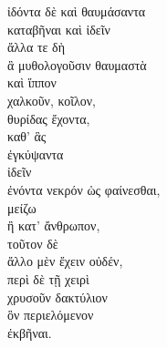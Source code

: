 {\large
\begin{greek}
\noindent ἰδόντα δὲ καὶ θαυμάσαντα\\
καταβῆναι καὶ ἰδεῖν\\
ἄλλα τε δὴ\\
\tabto{2em} ἃ μυθολογοῦσιν θαυμαστὰ\\
καὶ ἵππον\\
\tabto{2em} χαλκοῦν, κοῖλον,\\
\tabto{2em} θυρίδας ἔχοντα,\\
\tabto{4em} καθ' ἃς\\
\tabto{4em} ἐγκύψαντα\\
\tabto{4em} ἰδεῖν\\
\tabto{4em} ἐνόντα νεκρόν ὡς φαίνεσθαι,\\
\tabto{4em} μείζω\\
\tabto{6em} ἢ κατ' ἄνθρωπον,\\
\tabto{4em} τοῦτον δὲ\\
\tabto{6em} ἄλλο μὲν ἔχειν οὐδέν,\\
\tabto{6em} περὶ δὲ τῇ χειρὶ\\
\tabto{6em} χρυσοῦν δακτύλιον\\
\tabto{4em} ὃν περιελόμενον\\
\tabto{4em} ἐκβῆναι.\\

\end{greek}
}

